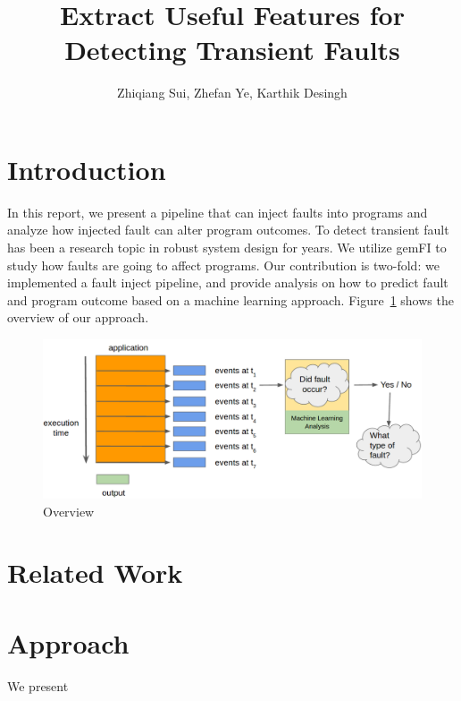 \documentclass{sig-alternate}
\title{Extract Useful Features for Detecting Transient Faults}
\author{Zhiqiang Sui, Zhefan Ye, Karthik Desingh}
\begin{document}
\maketitle
\thispagestyle{firstpage}
\pagestyle{plain}

\begin{abstract}

\end{abstract}

\section{Introduction}
In this report, we present a pipeline that can inject faults into programs and analyze how injected fault can alter program outcomes. To detect transient fault has been a research topic in robust system design for years. We utilize gemFI to study how faults are going to affect programs. Our contribution is two-fold: we implemented a fault inject pipeline, and provide analysis on how to predict fault and program outcome based on a machine learning approach. Figure~\ref{fig:teaser} shows the overview of our approach.

\begin{figure}[t]
\begin{center}
   \includegraphics[width=0.95\linewidth]{./figures/teaser.png}
\end{center}
   \caption{Overview}
\label{fig:teaser}
\end{figure}

\section{Related Work}

\section{Approach}
We present
\end{document}
